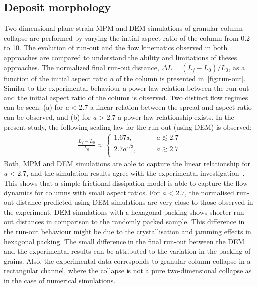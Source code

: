 \subsection{Deposit morphology}
Two-dimensional plane-strain MPM and DEM simulations of granular column 
collapse are 
performed by varying the initial aspect ratio of the column from 0.2 to 10. The 
evolution of run-out and the flow kinematics observed in both approaches are 
compared to understand the ability and limitations of theses approaches.  
The normalized final run-out distance, $\Delta L = 
(L_{\textit{f}}-L_{\textit{0}})/L_{\textit{0}}$, as a function of the initial 
aspect ratio \textit{a} of the column is presented in~\cref{fig:run-out}. 
Similar to 
the experimental behaviour a power law relation between the run-out and the 
initial aspect ratio of the column is observed. Two distinct flow regimes can 
be seen: (a) for \textit{a} < 2.7 a linear relation between the spread and 
aspect 
ratio can be observed, and (b) for \textit{a} > 2.7 a power-law relationship 
exists. 
In the present study, the following scaling law for the run-out (using DEM) is 
observed:
\begin{align}
\frac{L_{\textit{f}}-L_{\textit{0}}}{L_{\textit{0}}} \approx  
\begin{cases}
1.67 a, &\qquad \textit{a}\lesssim 2.7 \\
2.7 a^{2/3}, &\qquad \textit{a} \gtrsim 2.7 \\
\end{cases}
\end{align}
Both, MPM and DEM simulations are able to capture the linear relationship for 
\textit{a} < 2.7, and the simulation results agree with the experimental 
investigation~\citep{Lajeunesse2005}. This shows that a simple frictional 
dissipation model is able to capture the flow dynamics for columns with small 
aspect ratios. For \textit{a} < 2.7, the normalised run-out distance predicted 
using 
DEM simulations are very close to those observed in the experiment. DEM 
simulations with a hexagonal packing shows shorter run-out distances in 
comparison to the randomly packed sample. This difference in the run-out 
behaviour 
might be due to the crystallisation and jamming effects in hexagonal packing. 
The small difference in the final run-out between the DEM and the experimental 
results can be attributed to the variation in the packing of grains. Also, the 
experimental data corresponds to granular column collapse in a rectangular 
channel, where the collapse is not a pure two-dimensional collapse as in the 
case of numerical simulations. 

